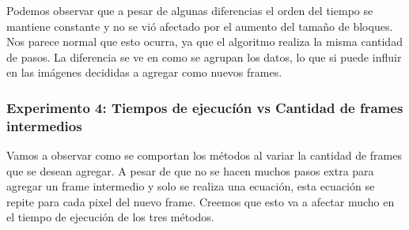 \begin{figure}[ht]
	\begin{center}
	\end{center}
\end{figure}
\par Podemos observar que a pesar de algunas diferencias el orden del tiempo se mantiene constante y no se vi\'o afectado por el aumento del tama\~no de bloques. Nos parece normal que esto ocurra, ya que el algoritmo realiza la misma cantidad de pasos. La diferencia se ve en como se agrupan los datos, lo que si puede influir en las im\'agenes decididas a agregar como nuevos frames.



\subsubsection{Experimento 4: Tiempos de ejecucí\'on vs Cantidad de frames intermedios}
\par Vamos a observar como se comportan los m\'etodos al variar la cantidad de frames que se desean agregar. A pesar de que no se hacen muchos pasos extra para agregar un frame intermedio y solo se realiza una ecuaci\'on, esta ecuaci\'on se repite para cada pixel del nuevo frame. Creemos que esto va a afectar mucho en el tiempo de ejecuci\'on de los tres m\'etodos.

